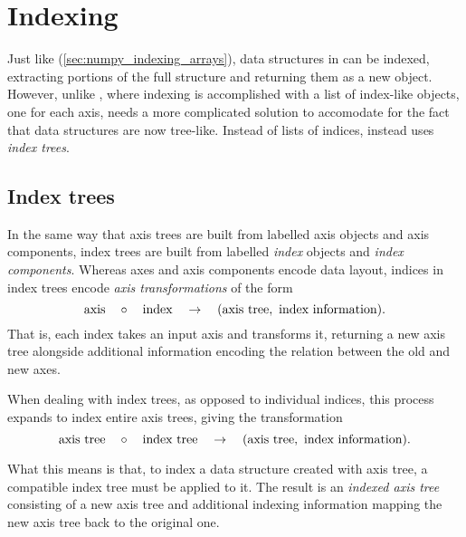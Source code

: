 \documentclass[thesis]{subfiles}
\begin{document}
\chapter{Indexing}
\label{chapter:indexing}

Just like \numpy{} (\cref{sec:numpy_indexing_arrays}), data structures in  can be indexed, extracting portions of the full structure and returning them as a new object.
However, unlike \numpy{}, where indexing is accomplished with a list of index-like objects, one for each axis,  needs a more complicated solution to accomodate for the fact that data structures are now tree-like.
Instead of lists of indices,  instead uses \emph{index trees}.

\section{Index trees}
\label{sec:index_trees}

In the same way that axis trees are built from labelled axis objects and axis components, index trees are built from labelled \emph{index} objects and \emph{index components}.
Whereas axes and axis components encode data layout, indices in index trees encode \emph{axis transformations} of the form
\begin{equation}
  \textnormal{axis} \quad \circ \quad \textnormal{index} \quad \to \quad (\textnormal{axis tree},\ \textnormal{index information}).
  \label{eq:index_transform}
\end{equation}
That is, each index takes an input axis and transforms it, returning a new axis tree alongside additional information encoding the relation between the old and new axes.

When dealing with index trees, as opposed to individual indices, this process expands to index entire axis trees, giving the transformation
\begin{equation}
  \textnormal{axis tree} \quad \circ \quad \textnormal{index tree} \quad \to \quad (\textnormal{axis tree},\ \textnormal{index information}).
\end{equation}

What this means is that, to index a data structure created with axis tree, a compatible index tree must be applied to it.
The result is an \emph{indexed axis tree} consisting of a new axis tree and additional indexing information mapping the new axis tree back to the original one.
\end{document}
